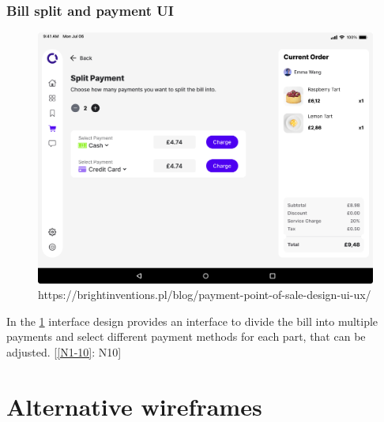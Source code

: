 \documentclass{article}
\begin{document}
\subsubsection{Bill split and payment UI}
\begin{figure}[H]
    \centering
    \includegraphics[width=0.9\linewidth]{HCI/images/split_payment.png}
    \caption{https://brightinventions.pl/blog/payment-point-of-sale-design-ui-ux/}
    \label{fig:Split_payment}
\end{figure}
\noindent
In the \cref{fig:Split_payment} interface design provides an interface to divide the bill into multiple payments and select different payment methods for each part, that can be adjusted. [\cref{N1-10}: N10]

\section{Alternative wireframes}
\end{document}
